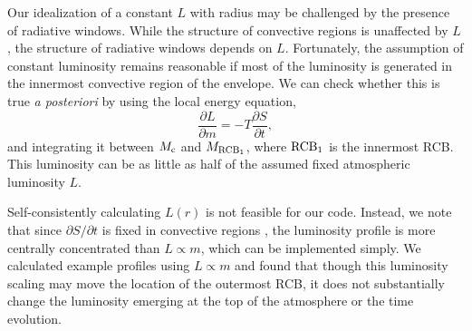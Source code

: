 {Our idealization of a constant $L$ with radius may be challenged by the presence of radiative windows. While the structure of convective regions is unaffected by $L$, the structure of radiative windows depends on $L$. Fortunately, the assumption of constant luminosity remains reasonable if most of the luminosity is generated in the innermost convective region of the envelope. We can check whether this is true \textit{a posteriori} by using the local energy equation,
\begin{equation}
\label{eq:localen}
\frac{\partial L}{\partial m}=-T \frac{\partial S}{\partial t},
\end{equation}
and integrating it between $M_{\rm c}$ and $M_{\rm{RCB_1}}$, where $\rm{RCB_1}$ is the innermost RCB. This luminosity can be as little as half of the assumed fixed atmospheric luminosity $L$.

Self-consistently calculating $L(r)$ is not feasible for our code. Instead, we note that since  $\partial S/\partial t$ is fixed in convective regions \citep{arras06}, the luminosity profile is more centrally concentrated than $L \propto m$, which can be implemented simply.  We calculated example profiles using $L \propto m$ and found that though this luminosity scaling may move the location of the outermost RCB, it does not substantially change the luminosity emerging at the top of the atmosphere or the time evolution. %



}
